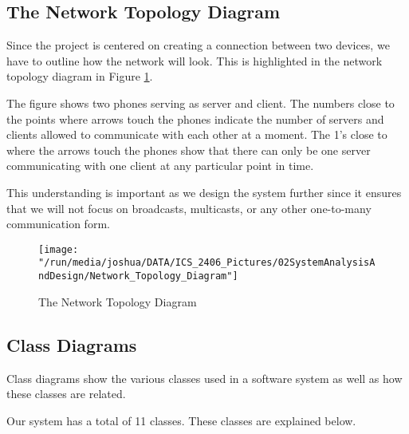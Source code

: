 \documentclass[12pt,svgnames,smaller]{article} %
\begin{document}
	\subsection{The Network Topology Diagram}
	
	Since the project is centered on creating a connection between two devices, we have to outline how the network will look. This is highlighted in the network topology diagram in Figure \ref{fig:SystemAnalysisandDesign-Network_Topology_Diagram}. 
	
	The figure shows two phones serving as server and client. The numbers close to the points where arrows touch the phones indicate the number of servers and clients allowed to communicate with each other at a moment. The 1's close to where the arrows touch the phones show that there can only be one server communicating with one client at any particular point in time. 
	
	This understanding is important as we design the system further since it ensures that we will not focus on broadcasts, multicasts, or any other one-to-many communication form.
	
	\begin{figure}
		\centering
		\texttt{[image: "/run/media/joshua/DATA/ICS\_2406\_Pictures/02SystemAnalysisAndDesign/Network\_Topology\_Diagram"]}
		\caption{The Network Topology Diagram}
		\label{fig:SystemAnalysisandDesign-Network_Topology_Diagram}
	\end{figure}
	
	
	\subsection{Class Diagrams}
	
	Class diagrams show the various classes used in a software system as well as how these classes are related.
	
	Our system has a total of 11 classes. These classes are explained below.
	
\end{document}
